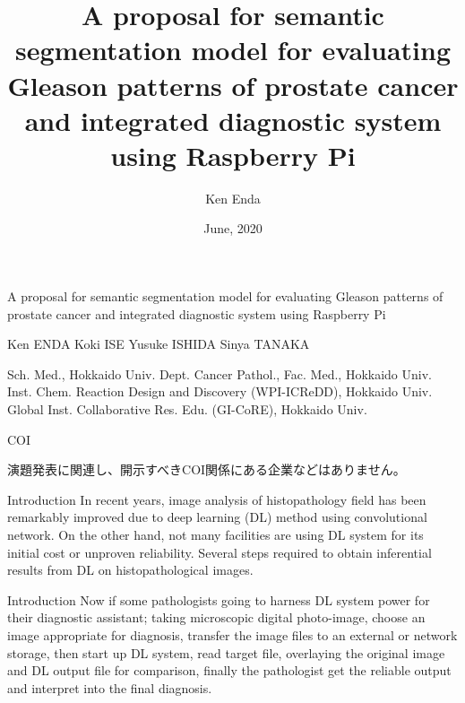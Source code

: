 \documentclass[
  dvipdfmx,
  xcolor={svgnames},
  hyperref={colorlinks,citecolor=DeepPink4,linkcolor=DarkRed,urlcolor=DarkBlue}
  ]{beamer}
\title{}
\title[A proposal of semantic segmentation model for Gleason patterns and integrated diagnostic system using Raspberry Pi]{A proposal for semantic segmentation model for evaluating Gleason patterns of prostate cancer and integrated diagnostic system using Raspberry Pi}
\author{Ken Enda}
\institute{Department of Cancer Pathology Faculty of Medicine, HOKKAIDO UNIVERSITY}
\date[]{June, 2020}
\begin{document}
\nocite{*}

\begin{frame}{}
  \huge A proposal for semantic segmentation model for evaluating Gleason patterns of prostate cancer and integrated diagnostic system using Raspberry Pi\par
  \vspace{0.5zh}
  \normalsize Ken ENDA \cite{student} Koki ISE\cite{student} Yusuke ISHIDA\cite{dept} Sinya TANAKA\cite{dept}\cite{icredd}\cite{gicore}
  \begin{thebibliography}{99}
    \beamertemplatetextbibitems
    \setlength{\itemsep}{-.5zw}
     Sch. Med., Hokkaido Univ.
     Dept. Cancer Pathol., Fac. Med., Hokkaido Univ.
     Inst. Chem. Reaction Design and Discovery (WPI-ICReDD), Hokkaido Univ.  
     Global Inst. Collaborative Res. Edu. (GI-CoRE), Hokkaido Univ.
  \end{thebibliography}
\end{frame}


\begin{frame}{COI}
    \setlength{\fboxsep}{1em}
    \par
    \vspace{1zh}
  \centering 演題発表に関連し、開示すべきCOI関係にある企業などはありません。
\end{frame}

\begin{frame}{Introduction}
  In recent years, image analysis of histopathology field has been remarkably improved due to deep learning (DL) method using convolutional network. On the other hand, not many facilities are using DL system for its initial cost or unproven reliability. Several steps required to obtain inferential results from DL on histopathological images.
\end{frame}

\begin{frame}{Introduction}
  Now if some pathologists going to harness DL system power for their diagnostic assistant; taking microscopic digital photo-image, choose an image appropriate for diagnosis, transfer the image files to an external or network storage, then start up DL system, read target file, overlaying the original image and DL output file for comparison, finally the pathologist get the reliable output and interpret into the final diagnosis.
\end{frame}
\end{document}
